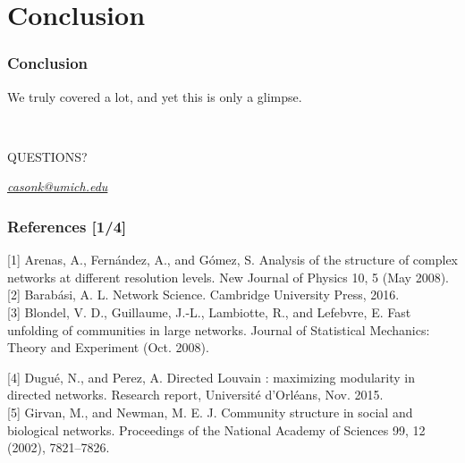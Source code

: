 \documentclass{beamer}
\newcommand{\XB}{\color{black}}
\newcommand{\XR}{\color{red}}
\begin{document}

\section{Conclusion}

\begin{frame}
    \frametitle{Conclusion}

    We truly covered a lot, and yet this is only a glimpse.\pause

    \hrulefill \\
    \Large{\centerline{\XR QUESTIONS?\XB}} 
    \normalsize{\centerline{\textit{\href{mailto:casonk@umich.edu}{casonk@umich.edu}}}}

\end{frame}

\begin{frame}
    \frametitle{References [1/4]}

    [1] Arenas, A., Fern{\'{a}}ndez, A., and G{\'{o}}mez, S.
    Analysis of the structure of complex networks at
    different resolution levels. New Journal of Physics 10, 5
    (May 2008). \\

    [2] Barab{\'{a}}si, A. L. Network Science. Cambridge
    University Press, 2016. \\

    [3] Blondel, V. D., Guillaume, J.-L., Lambiotte, R.,
    and Lefebvre, E. Fast unfolding of communities in
    large networks. Journal of Statistical Mechanics: Theory
    and Experiment (Oct. 2008).

    [4] Dugu{\'{e}}, N., and Perez, A. Directed Louvain :
    maximizing modularity in directed networks. Research
    report, Universit{\'{e}} d'Orl{\'{e}}ans, Nov. 2015. \\

    [5] Girvan, M., and Newman, M. E. J. Community
    structure in social and biological networks. Proceedings
    of the National Academy of Sciences 99, 12 (2002),
    7821–7826.

\end{frame}
\end{document}
